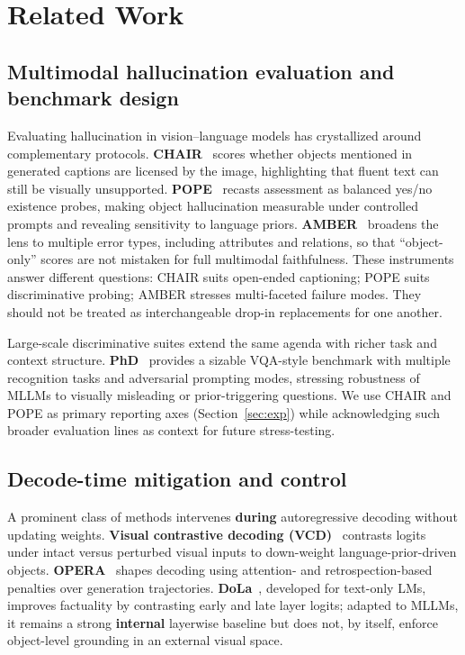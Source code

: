 \section{Related Work}
\label{sec:related}

\subsection{Multimodal hallucination evaluation and benchmark design}

Evaluating hallucination in vision--language models has crystallized around complementary protocols. \textbf{CHAIR}~\cite{rohrbach2018chair} scores whether objects mentioned in generated captions are licensed by the image, highlighting that fluent text can still be visually unsupported. \textbf{POPE}~\cite{li2023pope} recasts assessment as balanced yes/no existence probes, making object hallucination measurable under controlled prompts and revealing sensitivity to language priors. \textbf{AMBER}~\cite{amber2023} broadens the lens to multiple error types, including attributes and relations, so that ``object-only'' scores are not mistaken for full multimodal faithfulness. These instruments answer different questions: CHAIR suits open-ended captioning; POPE suits discriminative probing; AMBER stresses multi-faceted failure modes. They should not be treated as interchangeable drop-in replacements for one another.

Large-scale discriminative suites extend the same agenda with richer task and context structure. \textbf{PhD}~\cite{liu2025phd} provides a sizable VQA-style benchmark with multiple recognition tasks and adversarial prompting modes, stressing robustness of MLLMs to visually misleading or prior-triggering questions. We use CHAIR and POPE as primary reporting axes (Section~\ref{sec:exp}) while acknowledging such broader evaluation lines as context for future stress-testing.

\subsection{Decode-time mitigation and control}

A prominent class of methods intervenes \textbf{during} autoregressive decoding without updating weights. \textbf{Visual contrastive decoding (VCD)}~\cite{leng2024vcd} contrasts logits under intact versus perturbed visual inputs to down-weight language-prior-driven objects. \textbf{OPERA}~\cite{huang2024opera} shapes decoding using attention- and retrospection-based penalties over generation trajectories. \textbf{DoLa}~\cite{chuang2024dola}, developed for text-only LMs, improves factuality by contrasting early and late layer logits; adapted to MLLMs, it remains a strong \textbf{internal} layerwise baseline but does not, by itself, enforce object-level grounding in an external visual space.


